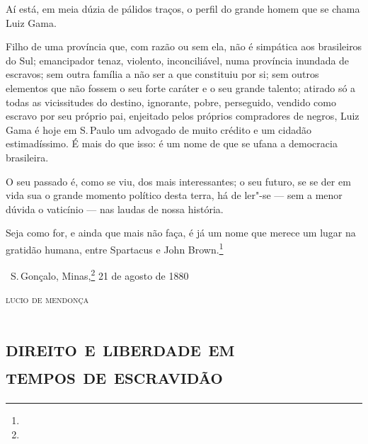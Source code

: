 Aí está, em meia dúzia de pálidos traços, o perfil do grande homem que
se chama Luiz Gama.

Filho de uma província que, com razão ou sem ela, não é simpática aos
brasileiros do Sul; emancipador tenaz, violento, inconciliável, numa
província inundada de escravos; sem outra família a não ser a que
constituiu por si; sem outros elementos que não fossem o seu forte
caráter e o seu grande talento; atirado só a todas as vicissitudes do
destino, ignorante, pobre, perseguido, vendido como escravo por seu
próprio pai, enjeitado pelos próprios compradores de negros, Luiz Gama é
hoje em S.\,Paulo um advogado de muito crédito e um cidadão
estimadíssimo. É mais do que isso: é um nome de que se ufana a
democracia brasileira.

O seu passado é, como se viu, dos mais interessantes; o seu futuro, se
se der em vida sua o grande momento político desta terra, há de ler"-se
--- sem a menor dúvida o vaticínio --- nas laudas de nossa história.

Seja como for, e ainda que mais não faça, é já um nome que merece um
lugar na gratidão humana, entre Spartacus e John Brown.\footnote{}

\bigskip

\hfill\ S.\,Gonçalo, Minas,\footnote{} 21 de agosto de 1880\smallskip

\hfill\textsc{lucio de mendonça}

\paginabranca
\begingroup\makeatletter\@openrightfalse
\part[direito e liberdade em tempos de escravidão]{\textsc{direito e liberdade em\\ tempos de escravidão}}

